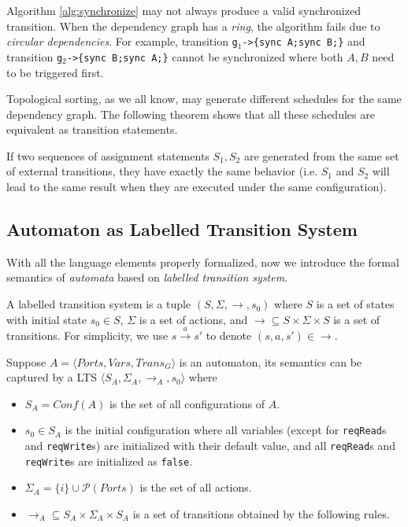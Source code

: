 Algorithm \ref{alg:synchronize} may not always produce a valid synchronized transition. When the dependency graph has a \emph{ring}, the algorithm fails due to \emph{circular dependencies}. For example, transition \texttt{g$_1$->\{sync A;sync B;\}} and transition \texttt{g$_2$->\{sync B;sync A;\}} cannot be synchronized where both $A,B$ need to be triggered first.

Topological sorting, as we all know, may generate different schedules for the same dependency graph. The following theorem shows that all these schedules are equivalent as transition statements.

\begin{theorem} If two sequences of assignment statements $S_1, S_2$ are generated from the same set of external transitions, they have exactly the same behavior (i.e. $S_1$ and $S_2$ will lead to the same result when they are executed under the same configuration).
\end{theorem}

\subsection{Automaton as Labelled Transition System}
\label{subsec:lts}

With all the language elements properly formalized, now we introduce the formal semantics of \emph{automata} based on \emph{labelled transition system}.

\begin{definition}
    A labelled transition system is a tuple $(S,\Sigma,\rightarrow,s_0)$ where $S$ is a set of states with initial state $s_0\in S$, $\Sigma$ is a set of actions, and $\rightarrow\subseteq S\times\Sigma\times S$ is a set of transitions. For simplicity, we use $s\xrightarrow{a} s'$ to denote $(s,a,s')\in\rightarrow$.
\end{definition}

Suppose $A=\langle Ports, Vars, Trans_G\rangle$ is an automaton, its semantics can be captured by a LTS $\langle S_A, \Sigma_A,\rightarrow_A,s_0\rangle$ where
\begin{itemize}
    \item $S_A=Conf(A)$ is the set of all configurations of $A$.
    \item $s_0\in S_A$ is the initial configuration where all variables (except for \texttt{reqRead}s and \texttt{reqWrite}s) are initialized with their default value, and all \texttt{reqRead}s and \texttt{reqWrite}s are initialized as \texttt{false}.
    \item $\Sigma_A=\{i\}\cup \mathcal{P}(Ports)$ is the set of all actions.
    \item $\rightarrow_A\subseteq S_A\times \Sigma_A\times S_A$ is a set of transitions obtained by the following rules.
\end{itemize}

